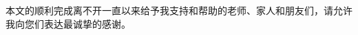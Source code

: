 
\begin{acknowledgements}
本文的顺利完成离不开一直以来给予我支持和帮助的老师、家人和朋友们，请允许我向您们表达最诚挚的感谢。


\end{acknowledgements}
